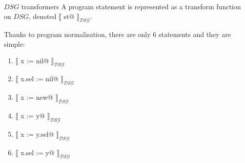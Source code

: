 \documentclass[xcolor={usenames,dvipsnames}]{beamer}
\makeatletter
\newcommand{\transformer}[2]{$\llbracket$ \lstinline@#1@
  $\rrbracket_{\mathcal{#2}}$}
\newcommand{\transformerDSG}[1]{\transformer{#1}{DSG}}
\makeatother
\begin{document}
\begin{frame}[fragile]{$DSG$ transformers}
  A program statement is represented as a transform function on $DSG$, denoted \transformerDSG{st}.

  \vspace{1em}

  Thanks to program normalisation, there are only 6 statements and they are simple:

  \begin{enumerate}
  \item \transformerDSG{x := nil}
  \item \transformerDSG{x.sel := nil}
  \item \transformerDSG{x := new}
  \item \transformerDSG{x := y}
  \item \transformerDSG{x := y.sel}
  \item \transformerDSG{x.sel := y}
  \end{enumerate}
\end{frame}
\end{document}
